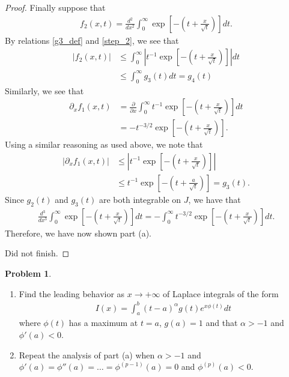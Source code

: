 \documentclass[12pt]{article}
\theoremstyle{definition}
\newtheorem{problem}{Problem}
\begin{document}
\begin{proof}
  Finally suppose that
  \begin{align*}
    f_2(x,t) = \frac{d^2}{dx^2} \int_0^\infty \exp\left[-\left(t + \frac{x}{\sqrt{t}}\right)\right] dt.
  \end{align*}
  By relations \eqref{g3_def} and \eqref{step_2}, we see that
  \begin{align*}
    \left|f_2(x,t)\right| &\leq \int_0^\infty \left|t^{-1}\exp\left[-\left(t + \frac{x}{\sqrt{t}}\right)\right]\right| dt \\
    &\leq \int_0^\infty g_3(t) dt  = g_4(t)
  \end{align*}
  Similarly, we see that
  \begin{align*}
    \partial_x f_1(x,t) &= \frac{\partial}{\partial x} \int_0^\infty t^{-1}\exp\left[-\left(t + \frac{x}{\sqrt{t}}\right)\right] dt \\
    &= -t^{-3/2}\exp\left[-\left(t + \frac{x}{\sqrt{t}}\right)\right].
  \end{align*}
  Using a similar reasoning as used above, we note that
  \begin{align*}
    \left|\partial_x f_1(x,t)\right| &\leq \left|t^{-1}\exp\left[-\left(t + \frac{x}{\sqrt{t}}\right)\right]\right| \\
    &\leq t^{-1}\exp\left[-\left(t + \frac{a}{\sqrt{t}}\right)\right]   = g_3(t).
  \end{align*}
  Since $g_2(t)$ and $g_3(t)$ are both integrable on $J$, we have that
  \begin{align*}
    \frac{d^3}{dx^3} \int_0^\infty \exp\left[-\left(t + \frac{x}{\sqrt{t}}\right)\right] dt = -\int_0^\infty t^{-3/2}\exp\left[-\left(t + \frac{x}{\sqrt{t}}\right)\right] dt.
  \end{align*}
  Therefore, we have now shown part (a).

  Did not finish.
\end{proof}
\newpage


\begin{problem}
  \begin{enumerate}
    \item Find the leading behavior as $x\to + \infty$ of Laplace integrals of the form
      \begin{align*}
        I(x) = \int_a^b (t-a) ^\alpha g(t) e^{x\phi(t)} dt
      \end{align*}
      where $\phi(t)$ has a maximum at $t = a$, $g(a) = 1$ and that $\alpha > -1$ and $\phi'(a) < 0$.
    \item Repeat the analysis of part (a) when $\alpha > -1$
      and $\phi'(a) = \phi''(a) = \dots = \phi^{(p-1)}(a) = 0$ and $\phi^{(p)}(a) < 0$.
  \end{enumerate}
\end{problem}
\end{document}
